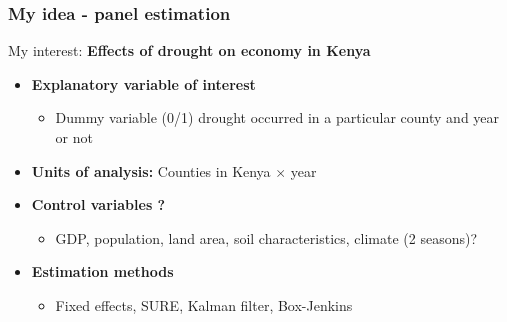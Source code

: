 \documentclass{beamer}              %
\begin{document}










\begin{frame}

\frametitle{My idea - panel estimation}\label{MySuggestion} 

My interest: \textbf{Effects of drought on economy in Kenya}
\begin{itemize}


\item \textbf{Explanatory variable of interest}

\begin{itemize}
\item Dummy variable (0/1) drought occurred in a particular county and year or not

\end{itemize}


\item \textbf{Units of analysis:} Counties in Kenya $\times$ year

\item \textbf{Control variables ?}

\begin{itemize}
\item GDP, population, land area, soil characteristics, climate (2 seasons)?
\end{itemize}

\item \textbf{Estimation methods}

\begin{itemize}
\item Fixed effects, SURE, Kalman filter, Box-Jenkins
\end{itemize}



\end{itemize}

\end{frame}
\end{document}
